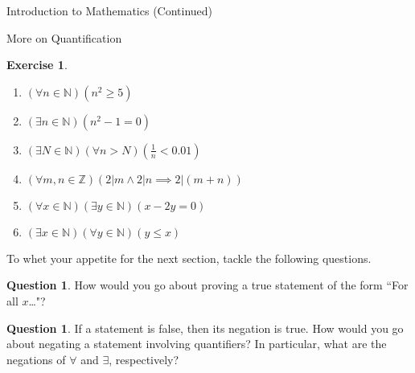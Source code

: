 \documentclass[11pt]{article}
\theoremstyle{definition}
\newtheorem{question}[theorem]{Question}
\newtheorem{exercise}[theorem]{Exercise}
\begin{document}
\begin{section}{Introduction to Mathematics (Continued)}
\begin{subsection}{More on Quantification}
\begin{exercise}
\begin{enumerate}
\item $(\forall n \in \mathbb{N})(n^2 \geq 5)$
\item $(\exists n \in \mathbb{N})(n^2-1=0)$
\item $(\exists N \in \mathbb{N})(\forall  n > N)(\frac{1}{n} < 0.01)$
\item $(\forall m, n \in \mathbb{Z})(2|m \wedge 2|n \implies 2|(m+n))$
\item $(\forall x \in \mathbb{N})(\exists y \in \mathbb{N})(x-2y=0)$
\item $(\exists x \in \mathbb{N})(\forall y \in \mathbb{N})(y \leq x)$
\end{enumerate}
\end{exercise}

To whet your appetite for the next section, tackle the following questions.

\begin{question}
How would you go about proving a true statement of the form ``For all $x$\ldots"?
\end{question}

\begin{question}
If a statement is false, then its negation is true.  How would you go about negating a statement involving quantifiers?  In particular, what are the negations of $\forall$ and $\exists$, respectively?
\end{question}

\end{subsection}

\end{section}
\end{document}
